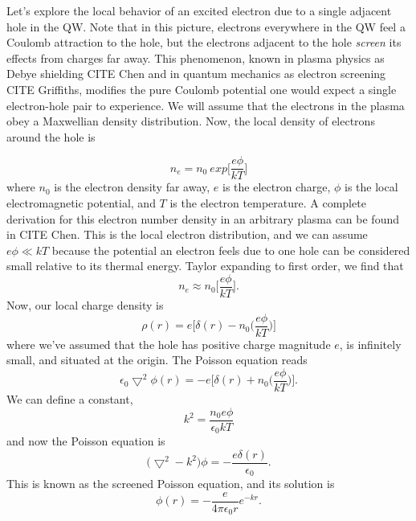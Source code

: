 \indent Let's explore the local behavior of an excited electron due to a single adjacent hole in the QW. Note that in this picture, electrons everywhere in the QW feel a Coulomb attraction to the hole, but the electrons adjacent to the hole \textit{screen} its effects from charges far away. This phenomenon, known in plasma physics as Debye shielding CITE Chen and in quantum mechanics as electron screening CITE Griffiths, modifies the pure Coulomb potential one would expect a single electron-hole pair to experience. We will assume that the electrons in the plasma obey a Maxwellian density distribution. Now, the local density of electrons around the hole is 

\begin{equation}
n_e = n_{0}~ exp \Big[ \frac{e\phi}{k T}\Big]
\end{equation}
where $n_{0}$ is the electron density far away, $e$ is the electron charge, $\phi$ is the local electromagnetic potential, and  $T$ is the electron temperature. A complete derivation for this electron number density in an arbitrary plasma can be found in CITE Chen. This is the local electron distribution, and we can assume $e\phi \ll kT$ because the potential an electron feels due to one hole can be considered small relative to its thermal energy. Taylor expanding to first order, we find that
\begin{equation}
n_e \approx n_0 \Big[ \frac{e\phi}{k T}\Big ].
\end{equation}
Now, our local charge density is 
\begin{equation}
\rho(r) = e \Big [ \delta(r) - n_0 \Big( \frac{e\phi}{k T}\Big ) \Big]
\end{equation}
where we've assumed that the hole has positive charge magnitude $e$, is infinitely small, and situated at the origin. The Poisson equation reads
\begin{equation} \label{pois}
\epsilon_0 \bigtriangledown^2 \phi(r) = -e \Big [ \delta(r) + n_0 \Big( \frac{e\phi}{k T}\Big ) \Big].
\end{equation}
We can define a constant, 
\begin{equation}
k^2 = \frac{n_0 e\phi}{\epsilon_0 k T}
\end{equation}
and now the Poisson equation is
\begin{equation}
\big(\bigtriangledown^2 - k^2 \big) \phi = - \frac{e \delta(r)}{\epsilon_0}.
\end{equation}
This is known as the screened Poisson equation, and its solution is
\begin{equation}
\phi(r) = -\frac{e}{4\pi \epsilon_0 r} e^{-k r}.
\end{equation}
